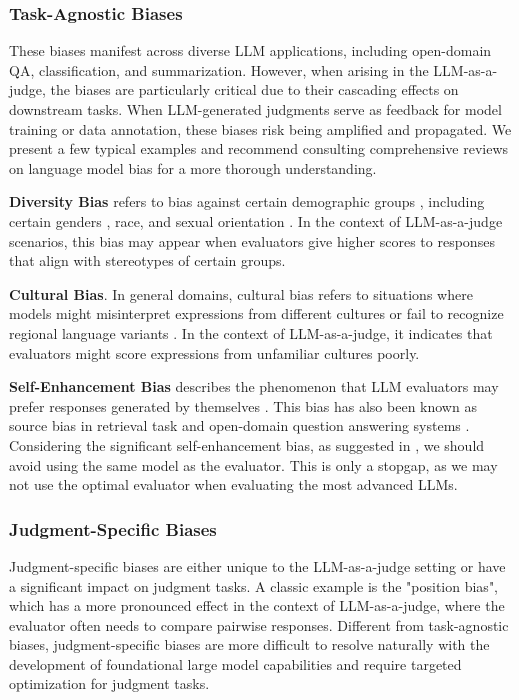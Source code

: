 \documentclass[acmsmall,screen]{acmart}
\begin{document}
\subsubsection{\textbf{Task-Agnostic Biases}}
\label{Evaluation:Task-Agnostic Biases}
These biases manifest across diverse LLM applications, including open-domain QA, classification, and summarization.
However, when arising in the LLM-as-a-judge, the biases are particularly critical due to their cascading effects on downstream tasks. 
When LLM-generated judgments serve as feedback for model training or data annotation, these biases risk being amplified and propagated.
We present a few typical examples and recommend consulting comprehensive reviews on language model bias \citep{llm_bias,llm_bias_2} for a more thorough understanding.

\textbf{Diversity Bias} refers to bias against certain demographic groups \cite{ye2024justice},  including certain genders \cite{chen2024humans}, race, and sexual orientation \cite{kumar2024subtle}.
In the context of LLM-as-a-judge scenarios, this bias may appear when evaluators give higher scores to responses that align with stereotypes of certain groups.

\textbf{Cultural Bias}. In general domains, cultural bias refers to situations where models might misinterpret expressions from different cultures or fail to recognize regional language variants \citep{llm_bias}. In the context of LLM-as-a-judge, it indicates that evaluators might score expressions from unfamiliar cultures poorly.


\textbf{Self-Enhancement Bias} describes the phenomenon that LLM evaluators may prefer responses generated by themselves \cite{nips_llm_as_a_judge,ye2024justice}.
This bias has also been known as source bias in retrieval task \citep{sourcebias} and open-domain question answering systems \citep{tan-etal-2024-blinded}.
Considering the significant self-enhancement bias, as suggested in \cite{ye2024justice}, we should avoid using the same model as the evaluator.
This is only a stopgap, as we may not use the optimal evaluator when evaluating the most advanced LLMs.




\subsubsection{\textbf{Judgment-Specific Biases}}
\label{Evaluation:Judgment-Specific Biases}
Judgment-specific biases are either unique to the LLM-as-a-judge setting or have a significant impact on judgment tasks. 
A classic example is the "position bias", which has a more pronounced effect in the context of LLM-as-a-judge, where the evaluator often needs to compare pairwise responses.
Different from task-agnostic biases, judgment-specific biases are more difficult to resolve naturally with the development of foundational large model capabilities and require targeted optimization for judgment tasks.
\end{document}
